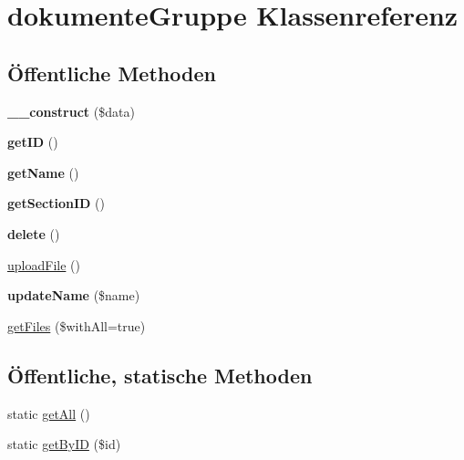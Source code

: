 \hypertarget{classdokumente_gruppe}{}\section{dokumente\+Gruppe Klassenreferenz}
\label{classdokumente_gruppe}
\subsection*{Öffentliche Methoden}
\begin{DoxyCompactItemize}
\item 
\mbox{\label{classdokumente_gruppe_a7b1db9295f0ff1f2da9f0f5900a09762}} 
{\bfseries \+\_\+\+\_\+construct} (\$data)
\item 
\mbox{\label{classdokumente_gruppe_af2773c809b0bb4db6c05bc5ebf918d03}} 
{\bfseries get\+ID} ()
\item 
\mbox{\label{classdokumente_gruppe_a61eb2c5119078f82f1dea113ff5004b3}} 
{\bfseries get\+Name} ()
\item 
\mbox{\label{classdokumente_gruppe_a7db377d173b569aae15cf87cd21a62f6}} 
{\bfseries get\+Section\+ID} ()
\item 
\mbox{\label{classdokumente_gruppe_a5cd6dfebe9c0c0c37040ebf6ec00c888}} 
{\bfseries delete} ()
\item 
\mbox{\hyperlink{classdokumente_gruppe_a731a1cf436e614b6e3f0ccd94a188035}{upload\+File}} ()
\item 
\mbox{\label{classdokumente_gruppe_aa90e3eca9ffea030f5bd53f512abf54c}} 
{\bfseries update\+Name} (\$name)
\item 
\mbox{\hyperlink{classdokumente_gruppe_a09c395452998f8062e8bb92d2b1a965e}{get\+Files}} (\$with\+All=true)
\end{DoxyCompactItemize}
\subsection*{Öffentliche, statische Methoden}
\begin{DoxyCompactItemize}
\item 
static \mbox{\hyperlink{classdokumente_gruppe_a6f9298fcd1326982edfee748482e823a}{get\+All}} ()
\item 
static \mbox{\hyperlink{classdokumente_gruppe_a570b936b4f9267c5d0ad87334ecef3eb}{get\+By\+ID}} (\$id)
\end{DoxyCompactItemize}


